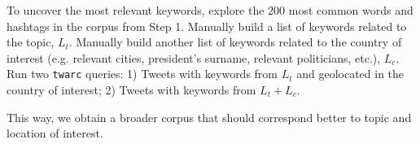             To uncover the most relevant keywords, explore the 200 most common words and hashtags in the corpus from Step 1. Manually build a list of keywords related to the topic, $L_{t}$. Manually build another list of keywords related to the country of interest (e.g. relevant cities, president's surname, relevant politicians, etc.), $L_{c}$. %
            Run two \texttt{twarc} queries: 1) Tweets with keywords from $L_{t}$ and geolocated in the country of interest; 2) Tweets with keywords from $L_{t} + L_{c}$.%
            
            This way, we obtain a broader corpus that should correspond better to topic and location of interest.
            

            


